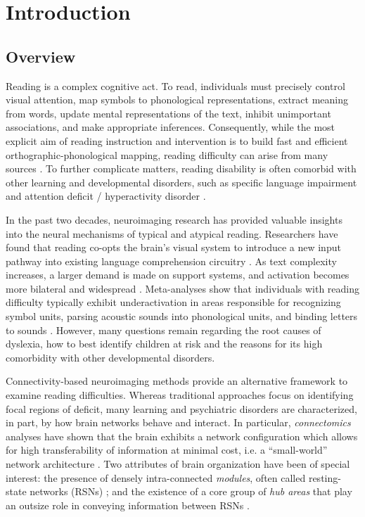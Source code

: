 \chapter{Introduction}

\section{Overview}
Reading is a complex cognitive act. To read, individuals must precisely control visual attention, map symbols to phonological representations, extract meaning from words, update mental representations of the text, inhibit unimportant associations, and make appropriate inferences. Consequently, while the most explicit aim of reading instruction and intervention is to build fast and efficient orthographic-phonological mapping, reading difficulty can arise from many sources \citep{Pennington2009, vanderLely2010}. To further complicate matters, reading disability is often comorbid with other learning and developmental disorders, such as specific language impairment and attention deficit / hyperactivity disorder \citep{Pennington2006, Margari2013}.

In the past two decades, neuroimaging research has provided valuable insights into the neural mechanisms of typical and atypical reading. Researchers have found that reading co-opts the brain's visual system to introduce a new input pathway into existing language comprehension circuitry \citep{Jobard2007}. As text complexity increases, a larger demand is made on support systems, and activation becomes more bilateral and widespread \citep{Xu2005}.  Meta-analyses show that individuals with reading difficulty typically exhibit underactivation in areas responsible for recognizing symbol units, parsing acoustic sounds into phonological units, and binding letters to sounds \citep{Maisog2008, Richlan2009, Paulesu2014}. However, many questions remain regarding the root causes of dyslexia, how to best identify children at risk and the reasons for its high comorbidity with other developmental disorders. 

Connectivity-based neuroimaging methods provide an alternative framework to examine reading difficulties. Whereas traditional approaches focus on identifying focal regions of deficit, many learning and psychiatric disorders are characterized, in part, by how brain networks behave and interact. In particular, \textit{connectomics} analyses have shown that the brain exhibits a network configuration which allows for high transferability of information at minimal cost, i.e. a “small-world” network architecture \citep{Bullmore2012}. Two attributes of brain organization have been of special interest: the presence of densely intra-connected \textit{modules}, often called resting-state networks (RSNs) \citep{Sporns2016}; and the existence of a core group of \textit{hub areas} that play an outsize role in conveying information between RSNs \citep{VandenHeuvel2011}. 

